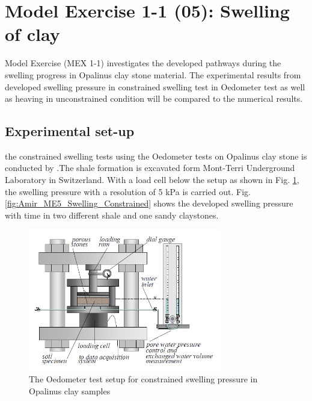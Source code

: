 \section{Model Exercise 1-1 (05): Swelling of clay}
\label{sec:mex05}
Model Exercise (MEX 1-1) investigates the developed pathways during the swelling progress in Opalinus clay stone material. The experimental results from developed swelling pressure in constrained swelling test in Oedometer test as well as heaving in unconstrained condition will be compared to the numerical results. 

\subsection{Experimental set-up}
the constrained swelling tests using the Oedometer tests on Opalinus clay stone is conducted by \cite{Peronetal2009}.The shale formation is excavated form Mont-Terri Underground Laboratory in Switzerland. With a load cell below the setup as shown in Fig. \ref{fig:Amir_ME5_Swelling_Setup}, the swelling pressure with a resolution of 5 kPa is carried out. Fig. \ref{fig:Amir_ME5_Swelling_Constrained} shows the developed swelling pressure with time in two different shale  and one sandy claystones. 

\begin{figure}[!ht]
\centering
\includegraphics[width=0.75\textwidth]{figures/Amir_ME5_Swelling_Setup.png}
\caption{The Oedometer test setup for constrained swelling pressure in Opalinus clay samples \cite{Peronetal2009}}
\label{fig:Amir_ME5_Swelling_Setup}
\end{figure}

